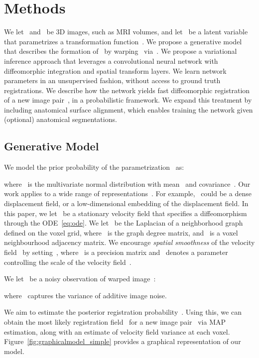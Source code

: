 \documentclass{article}
\begin{document}
 

\vspace{-0.1cm}
\section{Methods}
\label{sec:model}



We let~ and~ be 3D images, such as MRI volumes,   and let~ be a latent variable that parametrizes a transformation function~. We propose a generative model that describes the formation of~ by warping~ via~. 
We propose a variational inference approach that leverages a convolutional neural network with diffeomorphic integration and spatial transform layers. We learn network parameters in an unsupervised fashion, without access to ground truth registrations. We describe how the network yields fast diffeomorphic registration of a new image pair~, in a probabilistic framework. We expand this treatment by including anatomical surface alignment, which enables training the network given (optional) anatomical segmentations.

\subsection{Generative Model}



We model the prior probability of the parametrization~ as:

where~ is the multivariate normal distribution with mean~ and covariance~. 
Our work applies to a wide range of representations~. 
For example,~ could be a dense displacement field, or a low-dimensional embedding of the displacement field. In this paper, we let~ be a stationary velocity field that specifies a diffeomorphism through the ODE~\eqref{eq:ode}. We let~ be the Laplacian of a neighborhood graph defined on the voxel grid, where~ is the graph degree matrix, and~ is a voxel neighbourhood adjacency matrix. We encourage \textit{spatial smoothness} of the velocity field~ by setting~, where~ is a precision matrix and~ denotes a parameter controlling the scale of the velocity field~.


We let~ be a noisy observation of warped image~:

where~ captures the variance of additive image noise.

We aim to estimate the posterior registration probability~. Using this, we can obtain the most likely registration field~ for a new image pair~ via MAP estimation, along with an estimate of velocity field variance at each voxel. Figure~\ref{fig:graphicalmodel_simple} provides a graphical representation of our model. 
\end{document}

